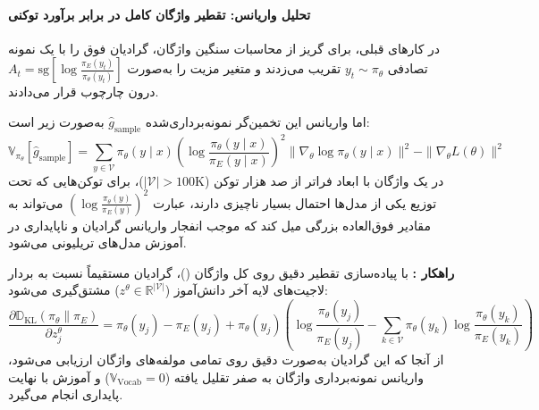 \paragraph*{تحلیل واریانس: تقطیر واژگان کامل در برابر برآورد توکنی}
در کارهای قبلی، برای گریز از محاسبات سنگین واژگان، گرادیان فوق را با یک نمونه تصادفی $y_t \sim \pi_\theta$ تقریب می‌زدند و متغیر مزیت را به‌صورت $A_t = \text{sg}\left[ \log \frac{\pi_E(y_t)}{\pi_\theta(y_t)} \right]$ درون چارچوب  قرار می‌دادند. 

اما واریانس این تخمین‌گر نمونه‌برداری‌شده $\hat{g}_{\text{sample}}$ به‌صورت زیر است:
\begin{equation}
    \mathbb{V}_{\pi_\theta}[\hat{g}_{\text{sample}}] = \sum_{y \in \mathcal{V}} \pi_\theta(y \mid x) \left( \log \frac{\pi_\theta(y \mid x)}{\pi_E(y \mid x)} \right)^2 \|\nabla_\theta \log \pi_\theta(y \mid x)\|^2 - \|\nabla_\theta L(\theta)\|^2
\end{equation}
در یک واژگان با ابعاد فراتر از صد هزار توکن ($|\mathcal{V}| > 100\text{K}$)، برای توکن‌هایی که تحت توزیع یکی از مدل‌ها احتمال بسیار ناچیزی دارند، عبارت $\left( \log \frac{\pi_\theta(y)}{\pi_E(y)} \right)^2$ می‌تواند به مقادیر فوق‌العاده بزرگی میل کند که موجب انفجار واریانس گرادیان و ناپایداری در آموزش مدل‌های تریلیونی می‌شود.

\textbf{راهکار :} با پیاده‌سازی تقطیر دقیق روی کل واژگان ()، گرادیان مستقیماً نسبت به بردار لاجیت‌های لایه آخر دانش‌آموز ($z^\theta \in \mathbb{R}^{|\mathcal{V}|}$) مشتق‌گیری می‌شود:
\begin{equation}
    \frac{\partial \mathbb{D}_{\text{KL}}(\pi_\theta \parallel \pi_E)}{\partial z_j^\theta} = \pi_\theta(y_j) - \pi_E(y_j) + \pi_\theta(y_j) \left( \log \frac{\pi_\theta(y_j)}{\pi_E(y_j)} - \sum_{k \in \mathcal{V}} \pi_\theta(y_k) \log \frac{\pi_\theta(y_k)}{\pi_E(y_k)} \right)
\end{equation}
از آنجا که این گرادیان به‌صورت دقیق روی تمامی مولفه‌های واژگان ارزیابی می‌شود، واریانس نمونه‌برداری واژگان به صفر تقلیل یافته ($\mathbb{V}_{\text{Vocab}} = 0$) و آموزش با نهایت پایداری انجام می‌گیرد.

